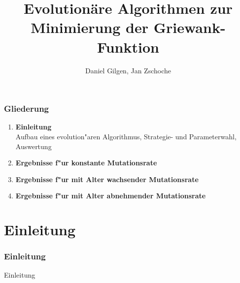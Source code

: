 \documentclass[]{beamer}
\begin{document}
\beamertemplatenavigationsymbolsempty

\title[EvoAlg]{Evolution\"are Algorithmen zur Minimierung der Griewank-Funktion}   
\author[D. Gilgen, J.Zschoche]{Daniel Gilgen, Jan Zschoche}
\date[Leipzig, 2016]{}

\begin{frame}
    \titlepage
\end{frame}

\begin{frame}\frametitle{Gliederung}
    \vspace{1cm}
    \begin{enumerate}
	\item \textbf{\large Einleitung}\\
		Aufbau eines evolution"aren Algorithmus, Strategie- und Parameterwahl, Auswertung \\[0.4cm]
	\item \textbf{\large Ergebnisse f"ur konstante Mutationsrate}\\[0.4cm]
	\item \textbf{\large Ergebnisse f"ur mit Alter wachsender Mutationsrate}\\[0.4cm]
	\item \textbf{\large Ergebnisse f"ur mit Alter abnehmender Mutationsrate}\\
    \end{enumerate}
\end{frame}


\section{Einleitung} 

\begin{frame}\frametitle{Einleitung} 
	
	\begin{center}
		\LARGE{Einleitung}	
	\end{center}
	
\end{frame}
\end{document}
